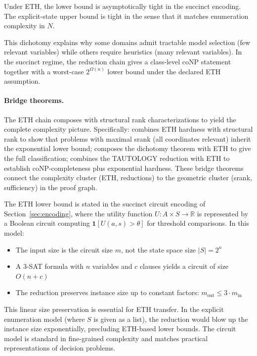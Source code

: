 \begin{remark}
Under ETH, the lower bound is asymptotically tight in the succinct encoding. The explicit-state upper bound is tight in the sense that it matches enumeration complexity in $N$.
\end{remark}

This dichotomy explains why some domains admit tractable model selection (few relevant variables) while others require heuristics (many relevant variables). In the succinct regime, the reduction chain gives a class-level coNP statement together with a worst-case $2^{\Omega(n)}$ lower bound under the declared ETH assumption.

\paragraph{Bridge theorems.} The ETH chain composes with structural rank characterizations to yield the complete complexity picture. Specifically:  combines ETH hardness with structural rank to show that problems with maximal srank (all coordinates relevant) inherit the exponential lower bound;  composes the dichotomy theorem with ETH to give the full classification;  combines the TAUTOLOGY reduction with ETH to establish coNP-completeness plus exponential hardness. These bridge theorems connect the complexity cluster (ETH, reductions) to the geometric cluster (srank, sufficiency) in the proof graph.

\begin{remark}
The ETH lower bound is stated in the succinct circuit encoding of Section~\ref{sec:encoding}, where the utility function $U: A \times S \to \mathbb{R}$ is represented by a Boolean circuit computing $\mathbf{1}[U(a,s) > \theta]$ for threshold comparisons. In this model:
\begin{itemize}
\item The input size is the circuit size $m$, not the state space size $|S| = 2^n$
\item A 3-SAT formula with $n$ variables and $c$ clauses yields a circuit of size $O(n + c)$
\item The reduction preserves instance size up to constant factors: $m_{\text{out}} \leq 3 \cdot m_{\text{in}}$
\end{itemize}
This linear size preservation is essential for ETH transfer. In the explicit enumeration model (where $S$ is given as a list), the reduction would blow up the instance size exponentially, precluding ETH-based lower bounds. The circuit model is standard in fine-grained complexity and matches practical representations of decision problems.
\end{remark}

